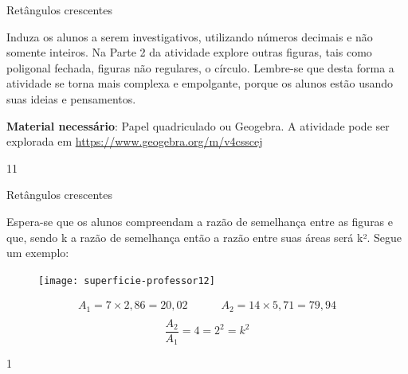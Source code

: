 \begin{sugestions}{Retângulos crescentes}
{
  Induza os alunos a serem investigativos, utilizando números decimais e não somente inteiros. Na Parte 2 da atividade explore outras figuras, tais como poligonal fechada, figuras não regulares, o círculo. Lembre-se que desta forma a atividade se torna mais complexa e empolgante, porque os alunos estão usando suas ideias e pensamentos.

  \textbf{Material necessário}: Papel quadriculado ou Geogebra. A atividade pode ser explorada em \url{https://www.geogebra.org/m/v4csscej} 

}{1}{1}
\end{sugestions}
\begin{answer}{Retângulos crescentes}
{
  Espera-se que os alunos compreendam a razão de semelhança entre as figuras e que, sendo k a razão de semelhança então a razão entre suas áreas será k². Segue um exemplo:

  \begin{figure}[H]
  \centering
  
  \texttt{[image: superficie-professor12]}
  \end{figure}

  \begin{align*}
  A_1=7\times2{,}86=20{,}02 \quad\quad\quad A_2  =14\times 5{,}71=79{,}94\\
  \end{align*}
  $$\frac{A_2}{A_1}=4=2^2=k^2$$
}{1}
\end{answer}


